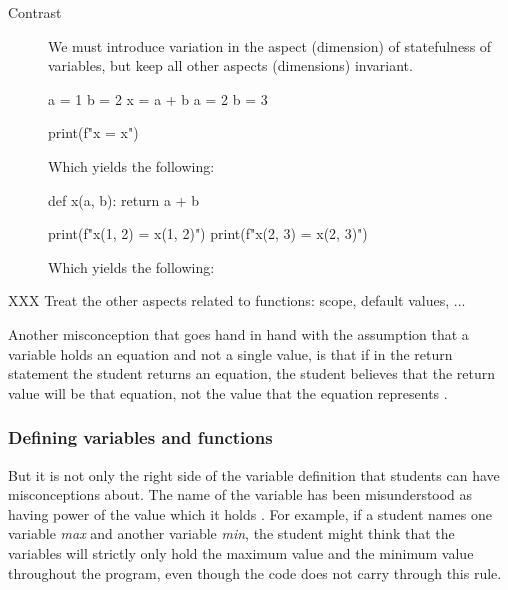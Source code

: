 \begin{description}
  \item [Contrast] We must introduce variation in the aspect (dimension) of 
    statefulness of variables, but keep all other aspects (dimensions) 
    invariant.

    \begin{minipage}[t]{0.45\columnwidth}
      \begin{pyblock}[funcC1][highlightlines=3]
a = 1
b = 2
x = a + b
a = 2
b = 3

print(f"x = {x}")
      \end{pyblock}

      \vspace{0.5em}
      Which yields the following:
      \printpythontex[verbatim]
    \end{minipage}
    \hfill
    \begin{minipage}[t]{0.45\columnwidth}
      \begin{pyblock}[funcC2][highlightlines={1-2}]
def x(a, b):
  return a + b



print(f"x(1, 2) = {x(1, 2)}")
print(f"x(2, 3) = {x(2, 3)}")
      \end{pyblock}

      \vspace{0.5em}
      Which yields the following:
      \printpythontex[verbatim]
    \end{minipage}
\end{description}

XXX Treat the other aspects related to functions: scope, default values, ...

Another misconception that goes hand in hand with the assumption that a 
variable holds an equation and not a single value, is that if in the return 
statement the student returns an equation, the student believes that the return 
value will be that equation, not the value that the equation represents 
\parencite{Kohn2017VariableEvaluation}.


\subsubsection{Defining variables and functions}

But it is not only the right side of the variable definition that students 
can 
have misconceptions about. The name of the variable has been misunderstood 
as 
having power of the value which it holds 
\parencite{MisconceptionsSurvey2017,Sleeman1984}. For example, if a student 
names one variable \emph{max} and another variable \emph{min}, the student 
might think that the variables will strictly only hold the maximum value 
and 
the minimum value throughout the program, even though the code does not 
carry through this rule. 

